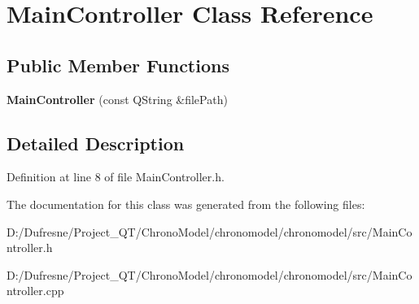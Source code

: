 \hypertarget{class_main_controller}{\section{Main\-Controller Class Reference}
\label{class_main_controller}
}
\subsection*{Public Member Functions}
\begin{DoxyCompactItemize}
\item 
\hypertarget{class_main_controller_adbbe185c0d3f3cdd89887319e738927a}{{\bfseries Main\-Controller} (const Q\-String \&file\-Path)}\label{class_main_controller_adbbe185c0d3f3cdd89887319e738927a}

\end{DoxyCompactItemize}


\subsection{Detailed Description}


Definition at line 8 of file Main\-Controller.\-h.



The documentation for this class was generated from the following files\-:\begin{DoxyCompactItemize}
\item 
D\-:/\-Dufresne/\-Project\-\_\-\-Q\-T/\-Chrono\-Model/chronomodel/chronomodel/src/Main\-Controller.\-h\item 
D\-:/\-Dufresne/\-Project\-\_\-\-Q\-T/\-Chrono\-Model/chronomodel/chronomodel/src/Main\-Controller.\-cpp\end{DoxyCompactItemize}
